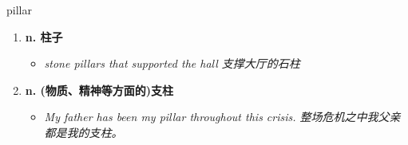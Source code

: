 
\begin{frame}
{\huge pillar}
\begin{center}
\begin{enumerate}\Large
  \item \textbf{n. 柱子}
  \begin{itemize}
    \item \em{\Large{stone pillars that supported the hall 支撑大厅的石柱}}
  \end{itemize}
  \item \textbf{n. (物质、精神等方面的)支柱}
  \begin{itemize}
    \item \em{\Large{My father has been my pillar throughout this crisis. 整场危机之中我父亲都是我的支柱。}}
  \end{itemize}
\end{enumerate}
\end{center}
\end{frame}
